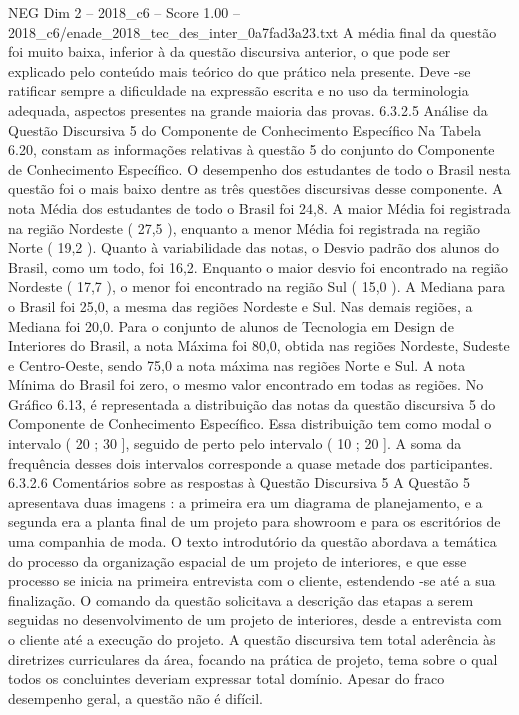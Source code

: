\begin{textsample}{NEG Dim 2 – 2018\_c6 – Score 1.00 – 2018\_c6/enade\_2018\_tec\_des\_inter\_0a7fad3a23.txt}
A média final da questão foi muito baixa, inferior à da questão discursiva anterior, o que pode ser explicado pelo conteúdo mais teórico do que prático nela presente.
Deve -se ratificar sempre a dificuldade na expressão escrita e no uso da terminologia adequada, aspectos presentes na grande maioria das provas. 6.3.2.5 Análise da Questão Discursiva 5 do Componente de Conhecimento Específico Na Tabela 6.20, constam as informações relativas à questão 5 do conjunto do Componente de Conhecimento Específico.
O desempenho dos estudantes de todo o Brasil nesta questão foi o mais baixo dentre as três questões discursivas desse componente.
A nota Média dos estudantes de todo o Brasil foi 24,8.
A maior Média foi registrada na região Nordeste ( 27,5 ), enquanto a menor Média foi registrada na região Norte ( 19,2 ).
Quanto à variabilidade das notas, o Desvio padrão dos alunos do Brasil, como um todo, foi 16,2.
Enquanto o maior desvio foi encontrado na região Nordeste ( 17,7 ), o menor foi encontrado na região Sul ( 15,0 ).
A Mediana para o Brasil foi 25,0, a mesma das regiões Nordeste e Sul.
Nas demais regiões, a Mediana foi 20,0.
Para o conjunto de alunos de Tecnologia em Design de Interiores do Brasil, a nota Máxima foi 80,0, obtida nas regiões Nordeste, Sudeste e Centro-Oeste, sendo 75,0 a nota máxima nas regiões Norte e Sul.
A nota Mínima do Brasil foi zero, o mesmo valor encontrado em todas as regiões.
No Gráfico 6.13, é representada a distribuição das notas da questão discursiva 5 do Componente de Conhecimento Específico.
Essa distribuição tem como modal o intervalo ( 20 ; 30 ], seguido de perto pelo intervalo ( 10 ; 20 ].
A soma da frequência desses dois intervalos corresponde a quase metade dos participantes. 6.3.2.6 Comentários sobre as respostas à Questão Discursiva 5 A Questão 5 apresentava duas imagens : a primeira era um diagrama de planejamento, e a segunda era a planta final de um projeto para showroom e para os escritórios de uma companhia de moda.
O texto introdutório da questão abordava a temática do processo da organização espacial de um projeto de interiores, e que esse processo se inicia na primeira entrevista com o cliente, estendendo -se até a sua finalização.
O comando da questão solicitava a descrição das etapas a serem seguidas no desenvolvimento de um projeto de interiores, desde a entrevista com o cliente até a execução do projeto.
A questão discursiva tem total aderência às diretrizes curriculares da área, focando na prática de projeto, tema sobre o qual todos os concluintes deveriam expressar total domínio.
Apesar do fraco desempenho geral, a questão não é difícil.

\end{textsample}
